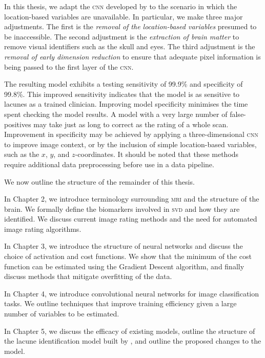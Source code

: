 In this thesis, we adapt the \textsc{cnn} developed by \cite{GhafoorianM.2017Dml3} to the scenario in which the location-based variables are unavailable. In particular, we make three major adjustments. The first is the \textit{removal of the location-based variables} presumed to be inaccessible. The second adjustment is the \textit{extraction of brain matter} to remove visual identifiers such as the skull and eyes. The third adjustment is the \textit{removal of early dimension reduction} to ensure that adequate pixel information is being passed to the first layer of the \textsc{cnn}.

The resulting model exhibits a testing sensitivity of 99.9\% and specificity of 99.8\%. This improved sensitivity indicates that the model is as sensitive to lacunes as a trained clinician. Improving model specificity minimises the time spent checking the model results. A model with a very large number of false-positives may take just as long to correct as the rating of a whole scan. Improvement in specificity may be achieved by applying a three-dimensional \textsc{cnn} to improve image context, or by the inclusion of simple location-based variables, such as the $x$, $y$, and $z$-coordinates. It should be noted that these methods require additional data preprocessing before use in a data pipeline.


We now outline the structure of the remainder of this thesis.

In Chapter 2, we introduce terminology surrounding \textsc{mri} and the structure of the brain. We formally define the biomarkers involved in \textsc{svd} and how they are identified. We discuss current image rating methods and the need for automated image rating algorithms.

In Chapter 3, we introduce the structure of neural networks and discuss the choice of activation and cost functions. We show that the minimum of the cost function can be estimated using the Gradient Descent algorithm, and finally discuss methods that mitigate overfitting of the data.

In Chapter 4, we introduce convolutional neural networks for image classification tasks. We outline techniques that improve training efficiency given a large number of variables to be estimated.

In Chapter 5, we discuss the efficacy of existing models, outline the structure of the lacune identification model built by \cite{GhafoorianM.2017Dml3}, and outline the proposed changes to the model.

